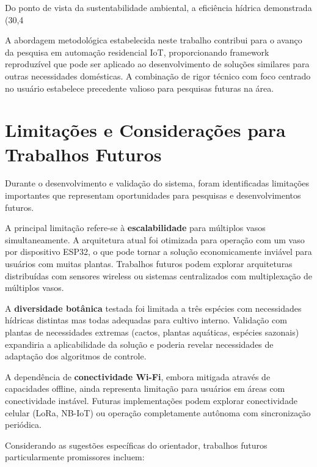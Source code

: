Do ponto de vista da sustentabilidade ambiental, a eficiência hídrica demonstrada (30,4%

A abordagem metodológica estabelecida neste trabalho contribui para o avanço da pesquisa em automação residencial IoT, proporcionando framework reproduzível que pode ser aplicado ao desenvolvimento de soluções similares para outras necessidades domésticas. A combinação de rigor técnico com foco centrado no usuário estabelece precedente valioso para pesquisas futuras na área.

\section{Limitações e Considerações para Trabalhos Futuros}

Durante o desenvolvimento e validação do sistema, foram identificadas limitações importantes que representam oportunidades para pesquisas e desenvolvimentos futuros.

A principal limitação refere-se à \textbf{escalabilidade} para múltiplos vasos simultaneamente. A arquitetura atual foi otimizada para operação com um vaso por dispositivo ESP32, o que pode tornar a solução economicamente inviável para usuários com muitas plantas. Trabalhos futuros podem explorar arquiteturas distribuídas com sensores wireless ou sistemas centralizados com multiplexação de múltiplos vasos.

A \textbf{diversidade botânica} testada foi limitada a três espécies com necessidades hídricas distintas mas todas adequadas para cultivo interno. Validação com plantas de necessidades extremas (cactos, plantas aquáticas, espécies sazonais) expandiria a aplicabilidade da solução e poderia revelar necessidades de adaptação dos algoritmos de controle.

A dependência de \textbf{conectividade Wi-Fi}, embora mitigada através de capacidades offline, ainda representa limitação para usuários em áreas com conectividade instável. Futuras implementações podem explorar conectividade celular (LoRa, NB-IoT) ou operação completamente autônoma com sincronização periódica.

Considerando as sugestões específicas do orientador, trabalhos futuros particularmente promissores incluem:

